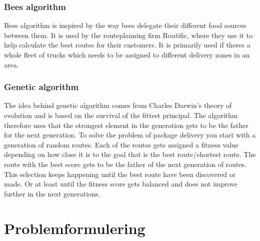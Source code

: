 \documentclass[12pt]{report}
\begin{document}
\subsection{Bees algorithm}
Bees algorithm is inspired by the way bees delegate their different food sources between them. It is used by the routeplanning firm Routific, where they use it to help calculate the best routes for their customers. It is primarily used if theres a whole fleet of trucks which needs to be assigned to different delivery zones in an area.    
\subsection{Genetic algorithm}
The idea behind genetic algorithm comes from Charles Darwin's theory of evolution and is based on the survival of the fittest principal. The algorithm therefore uses that the strongest element in the generation gets to be the father for the next generation. To solve the problem of package delivery you start with a generation of random routes. Each of the routes gets assigned a fitness value depending on how close it is to the goal that is the best route/shortest route. The route with the best score gets to be the father of the next generation of routes. This selection keeps happening until the best route have been discovered or made. Or at least until the fitness score gets balanced and does not improve further in the next generations.




\chapter{Problemformulering}
\end{document}
